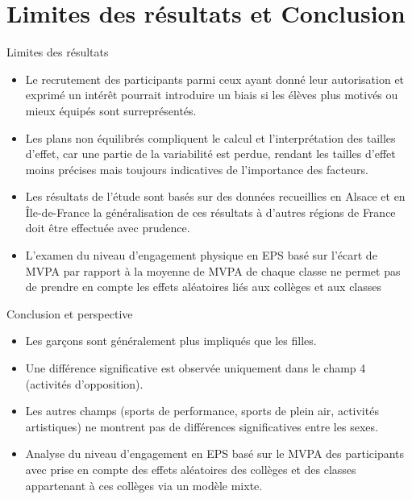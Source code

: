 \documentclass{beamer}
\begin{document}
	\section{Limites des résultats et Conclusion}
	\begin{frame}{Limites des résultats}
		\begin{itemize}
			\item Le recrutement des participants parmi ceux ayant donné leur autorisation et exprimé un intérêt pourrait introduire un biais si les élèves plus motivés ou mieux équipés sont surreprésentés.
			\item Les plans non équilibrés compliquent le calcul et l'interprétation des tailles d'effet, car une partie de la variabilité est perdue, rendant les tailles d'effet moins précises mais toujours indicatives de l'importance des facteurs.
			\item Les résultats de l'étude sont basés sur des données recueillies en Alsace et en Île-de-France la généralisation de ces résultats à d'autres régions de France doit être effectuée avec prudence.
			\item L'examen du niveau d'engagement physique en EPS basé sur l'écart de MVPA par rapport à la moyenne de MVPA de chaque classe ne permet pas de prendre en compte les effets aléatoires liés aux collèges et aux classes
		\end{itemize}
	\end{frame}
	
	\begin{frame}{Conclusion et perspective}
		\begin{itemize}
			\item Les garçons sont généralement plus impliqués que les filles.
			\item Une différence significative est observée uniquement dans le champ 4 (activités d'opposition).
			\item Les autres champs (sports de performance, sports de plein air, activités artistiques) ne montrent pas de différences significatives entre les sexes.
			\item Analyse du niveau d'engagement en EPS basé sur le MVPA des participants avec prise en compte des effets aléatoires des collèges et des classes appartenant à ces collèges via un modèle mixte.
			
		\end{itemize}
	\end{frame}
\end{document}
